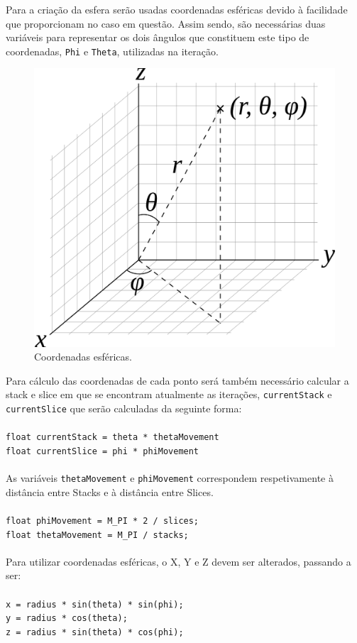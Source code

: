 \documentclass[a4paper]{article}
\begin{document}
Para a criação da esfera serão usadas coordenadas esféricas devido à facilidade que proporcionam no caso em questão. Assim sendo, são necessárias duas variáveis para representar os dois ângulos que constituem este tipo de coordenadas, \texttt{Phi} e \texttt{Theta}, utilizadas na iteração.

\begin{figure}[H]
\centering
\includegraphics[width=0.5\linewidth]{coords.png}
\caption{Coordenadas esféricas.}
\end{figure}

Para cálculo das coordenadas de cada ponto será também necessário calcular a stack e slice em que se encontram atualmente as iterações, \texttt{currentStack} e \texttt{currentSlice} que serão calculadas da seguinte forma:\\
\\
\texttt{float currentStack = theta * thetaMovement}\\
\texttt{float currentSlice = phi * phiMovement}\\
\\

As variáveis \texttt{thetaMovement} e \texttt{phiMovement} correspondem respetivamente à distância entre Stacks e à distância entre Slices.\\
\\
\texttt{float phiMovement = M\_PI * 2 / slices;}\\
\texttt{float thetaMovement = M\_PI / stacks;}\\
\\

Para utilizar coordenadas esféricas, o X, Y e Z devem ser alterados, passando a ser:\\
\\
\texttt{x = radius * sin(theta) * sin(phi);}\\
\texttt{y = radius * cos(theta);}\\
\texttt{z = radius * sin(theta) * cos(phi);}\\
\end{document}
